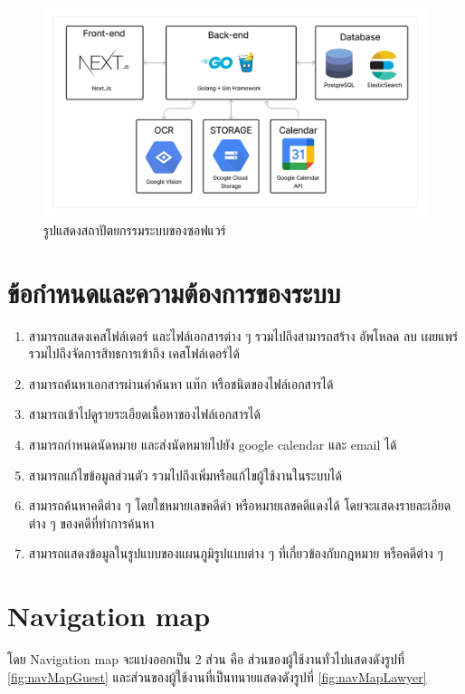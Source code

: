 \documentclass[12pt,oneside,openright,a4paper]{cpe-thai-project}
\begin{document}
\begin{figure}[!ht]\centering
  \includegraphics[width=13cm]{./assets/system-arch.png}
  \caption{รูปแสดงสถาปัตยกรรมระบบของซอฟแวร์}\label{fig:systemArch}
\end{figure}

\newpage

\section{ข้อกำหนดและความต้องการของระบบ}
\begin{enumerate}
  \item สามารถแสดงเคสโฟล์เดอร์ และไฟล์เอกสารต่าง ๆ รวมไปถึงสามารถสร้าง อัพโหลด ลบ เผยแพร่ รวมไปถึงจัดการสิทธการเข้าถึง เคสโฟล์เดอร์ได้
  \item สามารถค้นหาเอกสารผ่านคำค้นหา แท๊ก หรือชนิดของไฟล์เอกสารได้
  \item สามารถเข้าไปดูรายระเอียดเนื้อหาของไฟล์เอกสารได้
  \item สามารถกำหนดนัดหมาย และส่งนัดหมายไปยัง google calendar และ email ได้
  \item สามารถแก้ไขข้อมูลส่วนตัว รวมไปถึงเพิ่มหรือแก้ไขผู้ใช้งานในระบบได้
  \item สามารถค้นหาคดีต่าง ๆ โดยใชหมายเลขคดีดำ หรือหมายเลขคดีแดงได้ โดยจะแสดงรายละเอียดต่าง ๆ ของคดีที่ทำการค้นหา
  \item สามารถแสดงข้อมูลในรูปแบบของแผนภูมิรูปแบบต่าง ๆ ที่เกี่ยวข้องกับกฎหมาย หรือคดีต่าง ๆ
\end{enumerate}

\clearpage
\section{Navigation map}
\hspace*{1cm}โดย Navigation map จะแบ่งออกเป็น 2 ส่วน คือ ส่วนของผู้ใช้งานทั่วไปแสดงดังรูปที่ \ref{fig:navMapGuest} และส่วนของผู้ใช้งานที่เป็นทนายแสดงดังรูปที่ \ref{fig:navMapLawyer} \\
\end{document}
